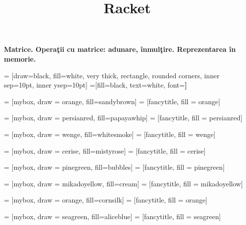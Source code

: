 \documentclass[a4paper]{article}
\title{Racket}
\begin{document}
\begin{center}{\huge{\textbf{Matrice. Operaţii cu matrice: adunare, înmulţire. Reprezentarea în memorie.}}}
\end{center}
\begin{multicols*}{3}

 = [draw=black, fill=white, very thick,
    rectangle, rounded corners, inner sep=10pt, inner ysep=10pt]
 =[fill=black, text=white, font=\bfseries]

 = [mybox, draw = orange, fill=sandybrown]
 = [fancytitle, fill = orange]


 = [mybox, draw = persianred, fill=papayawhip]
 = [fancytitle, fill = persianred]

 = [mybox, draw = wenge, fill=whitesmoke]
 = [fancytitle, fill = wenge]

 = [mybox, draw = cerise, fill=mistyrose]
 = [fancytitle, fill = cerise]

 = [mybox, draw = pinegreen, fill=bubbles]
 = [fancytitle, fill = pinegreen]

 = [mybox, draw = mikadoyellow, fill=cream]
 = [fancytitle, fill = mikadoyellow]

 = [mybox, draw = orange, fill=cornsilk]
 = [fancytitle, fill = orange]

 = [mybox, draw = seagreen, fill=aliceblue]
 = [fancytitle, fill = seagreen]


\end{multicols*}
\end{document}
